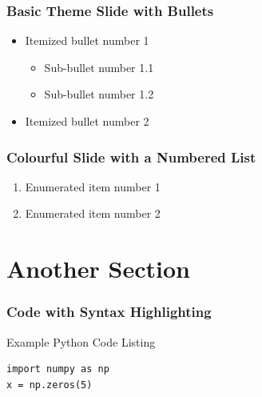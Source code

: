 \documentclass[fleqn]{ingenuitylabs-slides}
\begin{document}
\SlideThemeWhiteB
\begin{frame}
    \frametitle{Basic Theme Slide with Bullets}
    \begin{itemize}
        \item Itemized bullet number 1
        \begin{itemize}
            \item Sub-bullet number 1.1
            \item Sub-bullet number 1.2
        \end{itemize}
        \item Itemized bullet number 2
    \end{itemize}
\end{frame}


\SlideThemeColourful
\begin{frame}
    \frametitle{Colourful Slide with a Numbered List}
    \begin{enumerate}
        \item Enumerated item number 1
        \item Enumerated item number 2
    \end{enumerate}
\end{frame}


\section{Another Section}

\SlideThemeWhiteA
\begin{frame}
    \flushleft
    {\bf\LARGE \insertsection}
\end{frame}


\SlideWhite
\begin{frame}[fragile]
    \frametitle{Code with Syntax Highlighting}
    \begin{block}{Example Python Code Listing}
    \begin{verbatim}
import numpy as np
x = np.zeros(5)
    \end{verbatim}
    \end{block}
\end{frame}
\end{document}
